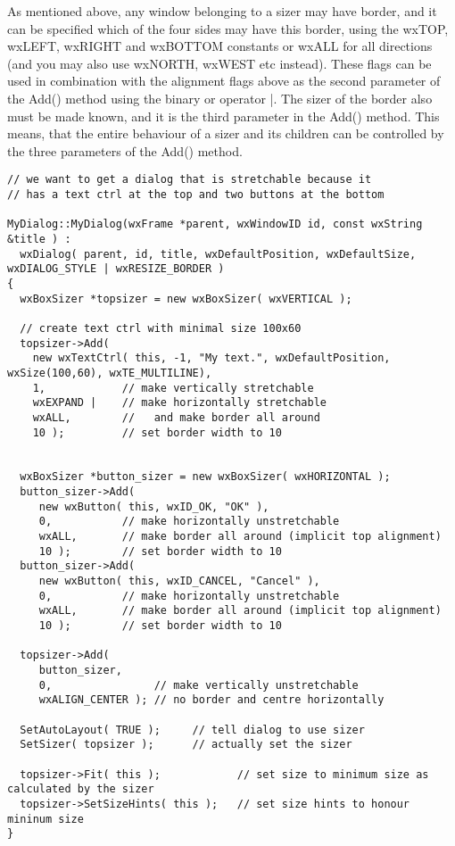 As mentioned above, any window belonging to a sizer may have border, and it can be specified
which of the four sides may have this border, using the wxTOP, wxLEFT, wxRIGHT and wxBOTTOM
constants or wxALL for all directions (and you may also use wxNORTH, wxWEST etc instead). These
flags can be used in combination with the alignment flags above as the second parameter of the
Add() method using the binary or operator |. The sizer of the border also must be made known,
and it is the third parameter in the Add() method. This means, that the entire behaviour of
a sizer and its children can be controlled by the three parameters of the Add() method.

\begin{verbatim}
// we want to get a dialog that is stretchable because it
// has a text ctrl at the top and two buttons at the bottom

MyDialog::MyDialog(wxFrame *parent, wxWindowID id, const wxString &title ) :
  wxDialog( parent, id, title, wxDefaultPosition, wxDefaultSize, wxDIALOG_STYLE | wxRESIZE_BORDER )
{
  wxBoxSizer *topsizer = new wxBoxSizer( wxVERTICAL );

  // create text ctrl with minimal size 100x60
  topsizer->Add(
    new wxTextCtrl( this, -1, "My text.", wxDefaultPosition, wxSize(100,60), wxTE_MULTILINE),
    1,            // make vertically stretchable
    wxEXPAND |    // make horizontally stretchable
    wxALL,        //   and make border all around
    10 );         // set border width to 10


  wxBoxSizer *button_sizer = new wxBoxSizer( wxHORIZONTAL );
  button_sizer->Add(
     new wxButton( this, wxID_OK, "OK" ),
     0,           // make horizontally unstretchable
     wxALL,       // make border all around (implicit top alignment)
     10 );        // set border width to 10
  button_sizer->Add(
     new wxButton( this, wxID_CANCEL, "Cancel" ),
     0,           // make horizontally unstretchable
     wxALL,       // make border all around (implicit top alignment)
     10 );        // set border width to 10

  topsizer->Add(
     button_sizer,
     0,                // make vertically unstretchable
     wxALIGN_CENTER ); // no border and centre horizontally

  SetAutoLayout( TRUE );     // tell dialog to use sizer
  SetSizer( topsizer );      // actually set the sizer

  topsizer->Fit( this );            // set size to minimum size as calculated by the sizer
  topsizer->SetSizeHints( this );   // set size hints to honour mininum size
}
\end{verbatim}

